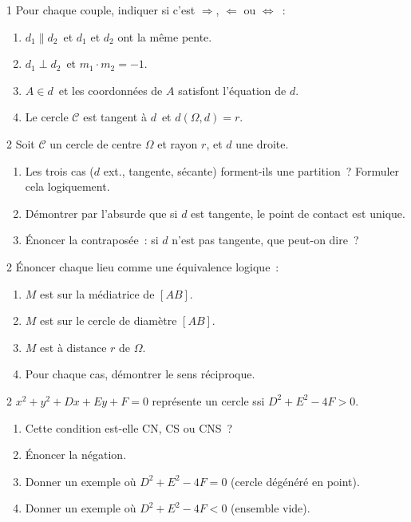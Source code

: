 \begin{bilan}
\begin{exo}{1}
Pour chaque couple, indiquer si c'est $\Rightarrow$, $\Leftarrow$ ou $\Leftrightarrow$~:
\begin{enumerate}
  \item \og $d_1\parallel d_2$\fg\ et \og $d_1$ et $d_2$ ont la m\^eme pente\fg.
  \item \og $d_1\perp d_2$\fg\ et \og $m_1\cdot m_2=-1$\fg.
  \item \og $A\in d$\fg\ et \og les coordonn\'ees de $A$ satisfont l'\'equation de $d$\fg.
  \item \og Le cercle $\mathcal{C}$ est tangent \`a $d$\fg\ et \og $d(\Omega,d)=r$\fg.
\end{enumerate}
\end{exo}

\begin{exo}{2}
Soit $\mathcal{C}$ un cercle de centre $\Omega$ et rayon $r$, et $d$ une droite.
\begin{enumerate}
  \item Les trois cas ($d$ ext., tangente, s\'ecante) forment-ils une partition~?
        Formuler cela logiquement.
  \item D\'emontrer par l'absurde que si $d$ est tangente,
        le point de contact est unique.
  \item \'Enoncer la contrapos\'ee~:
        si $d$ n'est pas tangente, que peut-on dire~?
\end{enumerate}
\end{exo}

\begin{exo}{2}
\'Enoncer chaque lieu comme une \'equivalence logique~:
\begin{enumerate}
  \item $M$ est sur la m\'ediatrice de $[AB]$.
  \item $M$ est sur le cercle de diam\`etre $[AB]$.
  \item $M$ est \`a distance $r$ de $\Omega$.
  \item Pour chaque cas, d\'emontrer le sens r\'eciproque.
\end{enumerate}
\end{exo}

\begin{exo}{2}
$x^2+y^2+Dx+Ey+F=0$ repr\'esente un cercle ssi $D^2+E^2-4F>0$.
\begin{enumerate}
  \item Cette condition est-elle CN, CS ou CNS~?
  \item \'Enoncer la n\'egation.
  \item Donner un exemple o\`u $D^2+E^2-4F=0$ (cercle d\'eg\'en\'er\'e en point).
  \item Donner un exemple o\`u $D^2+E^2-4F<0$ (ensemble vide).
\end{enumerate}
\end{exo}


\end{bilan}
